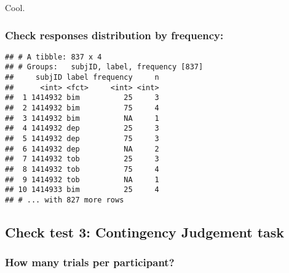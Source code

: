 \documentclass[
]{article}
\newenvironment{Shaded}{\begin{snugshade}}{\end{snugshade}}
\newcommand{\KeywordTok}[1]{\textcolor[rgb]{0.13,0.29,0.53}{\textbf{#1}}}
\newcommand{\NormalTok}[1]{#1}
\newcommand{\OperatorTok}[1]{\textcolor[rgb]{0.81,0.36,0.00}{\textbf{#1}}}
\newcommand{\StringTok}[1]{\textcolor[rgb]{0.31,0.60,0.02}{#1}}
\begin{document}
Cool.

\hypertarget{check-responses-distribution-by-frequency}{%
\subsubsection{Check responses distribution by
frequency:}\label{check-responses-distribution-by-frequency}}

\begin{Shaded}
\end{Shaded}

\begin{verbatim}
## # A tibble: 837 x 4
## # Groups:   subjID, label, frequency [837]
##     subjID label frequency     n
##      <int> <fct>     <int> <int>
##  1 1414932 bim          25     3
##  2 1414932 bim          75     4
##  3 1414932 bim          NA     1
##  4 1414932 dep          25     3
##  5 1414932 dep          75     3
##  6 1414932 dep          NA     2
##  7 1414932 tob          25     3
##  8 1414932 tob          75     4
##  9 1414932 tob          NA     1
## 10 1414933 bim          25     4
## # ... with 827 more rows
\end{verbatim}

\hypertarget{check-test-3-contingency-judgement-task}{%
\subsection{Check test 3: Contingency Judgement
task}\label{check-test-3-contingency-judgement-task}}

\begin{Shaded}
\end{Shaded}

\hypertarget{how-many-trials-per-participant-2}{%
\subsubsection{How many trials per
participant?}\label{how-many-trials-per-participant-2}}
\end{document}
